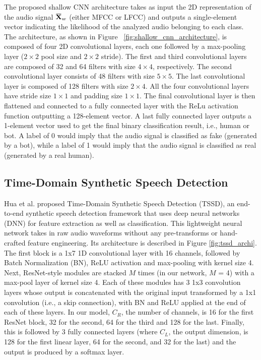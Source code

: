 \documentclass{article}
\newcommand{\overbar}[1]{\mkern 1.5mu\overline{\mkern-1.5mu#1\mkern-1.5mu}\mkern 1.5mu}
\begin{document}
The proposed shallow CNN architecture takes as input the 2D representation of the audio signal $\overbar{\mathbf{X}}_w$ (either MFCC or LFCC) and outputs a single-element vector indicating the likelihood of the analyzed audio belonging to each class. The architecture, as shown in Figure ~\ref{fig:shallow_cnn_architecture}, is composed of four 2D convolutional layers, each one followed by a max-pooling layer ($2 \times 2$ pool size and $2 \times 2$ stride). The first and third convolutional layers are composed of 32 and 64 filters with size $4 \times 4$, respectively. The second convolutional layer consists of 48 filters with size $5 \times 5$. The last convolutional layer is composed of 128 filters with size $2 \times 4$. All the four convolutional layers have stride size $1 \times 1$ and padding size $1 \times 1$. The final convolutional layer is then flattened and connected to a fully connected layer with the ReLu activation function outputting a 128-element vector. A last fully connected layer outputs a 1-element vector used to get the final binary classification result, i.e., human or bot. A label of 0 would imply that the audio signal is classified as fake (generated by a bot), while a label of 1 would imply that the audio signal is classified as real (generated by a real human).

\subsection{Time-Domain Synthetic Speech Detection}

Hua et al. \cite{Hua_2021} proposed Time-Domain Synthetic Speech Detection (TSSD), an end-to-end synthetic speech detection framework that uses deep neural networks (DNN) for feature extraction as well as classification. This lightweight neural network takes in raw audio waveforms without any pre-transforms or hand-crafted feature engineering. Its architecture is described in Figure \ref{fig:tssd_archi}. The first block is a 1x7 1D convolutional layer with 16 channels, followed by Batch Normalization (BN), ReLU activation and max-pooling with kernel size 4. Next, ResNet-style modules \cite{He2016DeepRL} are stacked $M$ times (in our network, $M$ = 4) with a max-pool layer of kernel size 4. Each of these modules has 3 1x3 convolution layers whose output is concatenated with the original input transformed by a 1x1 convolution (i.e., a skip connection), with BN and ReLU applied at the end of each of these layers. In our model, $C_R$, the number of channels, is 16 for the first ResNet block, 32 for the second, 64 for the third and 128 for the last. Finally, this is followed by 3 fully connected layers (where $C_L$, the output dimension, is 128 for the first linear layer, 64 for the second, and 32 for the last) and the output is produced by a softmax layer.
\end{document}
